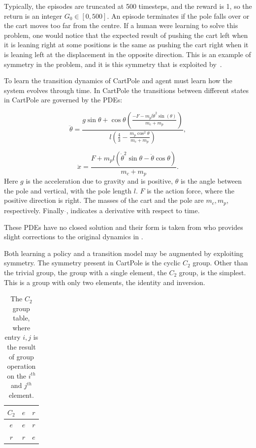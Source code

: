 Typically, the episodes are truncated at 500 timesteps, and the reward is 1, so the return is an integer $G_0 \in [0, 500]$. An episode terminates if the pole falls over or the cart moves too far from the centre. If a human were learning to solve this problem, one would notice that the expected result of pushing the cart left when it is leaning right at some positions is the same as pushing the cart right when it is leaning left at the displacement in the opposite direction. This is an example of symmetry in the problem, and it is this symmetry that is exploited by~\cite{vanderpol2020mdp, mondal2020group}.

To learn the transition dynamics of CartPole and agent must learn how the system evolves through time. In CartPole the transitions between different states in CartPole are governed by the PDEs:

\begin{equation}
	\ddot{\theta} = \frac{g \sin \theta + \cos\theta \left({\frac{-F - m_p l \dot{\theta}^2 \sin(\theta)}{m_c + m_p}} \right )}{l\left ( \frac{4}{3} - \frac{m_p \cos^2 \theta}{m_c + m_p}\right)},
\end{equation}

\begin{equation}
	\ddot{x} = \frac{ F + m_p l (\dot{\theta}^2 \sin \theta - \ddot{\theta} \cos \theta)}{m_c + m_p}.
\end{equation}
Here $g$ is the acceleration due to gravity and is positive, $\theta$ is the angle between the pole and vertical, with the pole length $l$. $F$ is the action force, where the positive direction is right. The masses of the cart and the pole are $m_c, m_p$, respectively. Finally $\dot{}$, indicates a derivative with respect to time.

These PDEs have no closed solution and their form is taken from \cite{florian2007correct} who provides slight corrections to the original dynamics in \cite{barto1983neuronlike}.

Both learning a policy and a transition model may be augmented by exploiting symmetry. The symmetry present in CartPole is the cyclic $C_2$ group. Other than the trivial group, the group with a single element, the $C_2$ group, is the simplest. This is a group with only two elements, the identity and inversion.
\begin{table}[h!]\label{tab:c2}
	\centering
	\begin{tabular}{c | c  c}
		$C_2$ & $e$ & $r$ \\
		\hline
		$e$   & $e$ & $r$ \\
		$r$   & $r$ & $e$
	\end{tabular}
	\caption{The $C_2$ group table, where entry $i, j$ is the result of group operation on the $i^{th}$ and $j^{th}$ element.}
\end{table}



